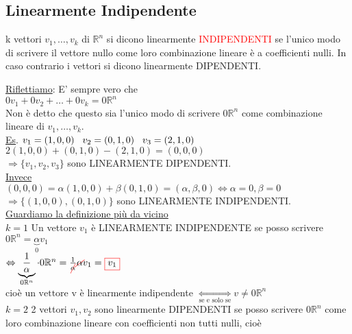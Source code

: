 \subsection{Linearmente Indipendente}
\begin{definition}
	k vettori $v_1, \dots, v_k$ di $\mathbb{R}^n$ si dicono linearmente \textcolor{red}{INDIPENDENTI} se l'unico modo di scrivere il vettore nullo come loro combinazione lineare è a coefficienti nulli. In caso contrario i vettori si dicono linearmente DIPENDENTI.
\end{definition}

\textsf{\underline{Riflettiamo}: E' sempre vero che}\\
$ 0v_1 + 0v_2 + \dots + 0v_k = 0\mathbb{R}^n$\\
\textsf{\small Non è detto che questo sia l'unico modo di scrivere $0\mathbb{R}^n$ come combinazione lineare di $v_1, \dots, v_k$.}\\
\textsf{\underline{Es}.} $v_1 = (1,0,0) \hspace{0.3cm} v_2 = (0,1,0) \hspace{0.3cm} v_3 = (2,1,0)$\\
$2(1,0,0) + (0,1,0) - (2,1,0) = (0,0,0)$\\
$\Rightarrow \{ v_1, v_2, v_3\}$ sono LINEARMENTE DIPENDENTI.\\
\textsf{\underline{Invece}}\\
$(0,0,0) = \alpha(1,0,0) + \beta(0,1,0) = (\alpha, \beta, 0) \Leftrightarrow \alpha = 0 , \beta = 0$\\
$\Rightarrow \{ (1,0,0),(0,1,0)\}$ sono LINEARMENTE INDIPENDENTI.\\
\centering \textsf{\underline{Guardiamo la definizione più da vicino}}\\
\flushleft $\boxed{k = 1}$ Un vettore $v_1$ è LINEARMENTE INDIPENDENTE se posso scrivere \centering$0\mathbb{R}^n = \underbrace{\alpha} _{0} v_1$\\
\flushleft$\Leftrightarrow \underbrace{\frac{1}{\alpha}} _{0\mathbb{R}^n} \cdot 0\mathbb{R}^n = \frac{1}{\color{red}\cancel{\normalcolor\alpha}}\color{red}\cancel{\normalcolor\alpha} \normalcolor v_1 = \color{red}\boxed{\normalcolor v_1}$\normalcolor\\
\textsf{\small cioè $\boxed{\text{un vettore}}$ v è linearmente indipendente $\underset{\text{se e solo se}}{\Leftrightarrow} v \neq 0\mathbb{R}^n$}\\
$\boxed{k = 2}$ 2 vettori $v_1, v_2$ sono linearmente DIPENDENTI se posso scrivere $0\mathbb{R}^n$ come loro combinazione lineare con coefficienti non tutti nulli, cioè \\
